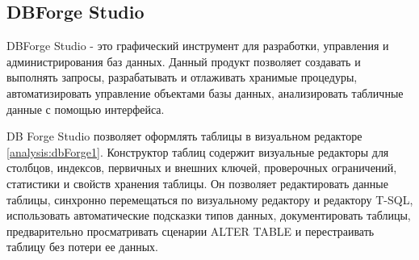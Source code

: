 \begin{figure}[ht!]
\end{figure}

\newpage

\subsection{DBForge Studio}

DBForge Studio \cite{bib16} - это графический инструмент для разработки, управления и администрирования баз данных. 
Данный продукт позволяет создавать и выполнять запросы, разрабатывать и отлаживать хранимые процедуры, автоматизировать управление объектами базы данных,
анализировать табличные данные с помощью интерфейса. 

DB Forge Studio позволяет оформлять таблицы в визуальном редакторе \ref{analysis:dbForge1}.
Конструктор таблиц содержит визуальные редакторы для столбцов, индексов,
первичных и внешних ключей, проверочных ограничений, 
статистики и свойств хранения таблицы. 
Он позволяет редактировать данные таблицы, 
синхронно перемещаться по визуальному редактору и редактору T-SQL, использовать 
автоматические подсказки типов данных, документировать таблицы, 
предварительно просматривать сценарии ALTER TABLE и перестраивать таблицу без потери ее данных.


